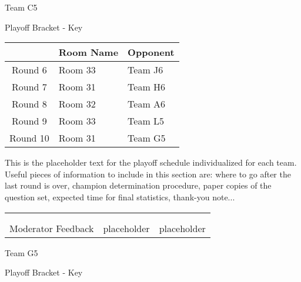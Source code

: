 \documentclass{article}%
\begin{document}
\newpage%
\begin{center}%
\begin{Huge}%
Team C5%
\end{Huge}%
\vspace*{12pt}%
\linebreak%
\begin{Large}%
Playoff Bracket {-} Key%
\end{Large}%
\end{center}%
\vspace*{4pt}%
%
\begin{tabularx}{\textwidth}{|c|Y|Y|}%
\hline%
&Room Name&Opponent\\%
\hline%
Round 6&Room 33&Team J6\\%
Round 7&Room 31&Team H6\\%
Round 8&Room 32&Team A6\\%
Round 9&Room 33&Team L5\\%
Round 10&Room 31&Team G5\\%
\hline%
\end{tabularx}%
\vspace*{30pt}%
\linebreak%
This is the placeholder text for the playoff schedule individualized for each team. Useful pieces of information to include in this section are: where to go after the last round is over, champion determination procedure, paper copies of the question set, expected time for final statistics, thank{-}you note...%
\vspace*{30pt}%
\newline%
%
\begin{tabularx}{\textwidth}{YYY}%
  &  &  \\%
\\%
Moderator Feedback&placeholder&placeholder\\%
\end{tabularx}%
\newpage%
\begin{center}%
\begin{Huge}%
Team G5%
\end{Huge}%
\vspace*{12pt}%
\linebreak%
\begin{Large}%
Playoff Bracket {-} Key%
\end{Large}%
\end{center}%
\end{document}
